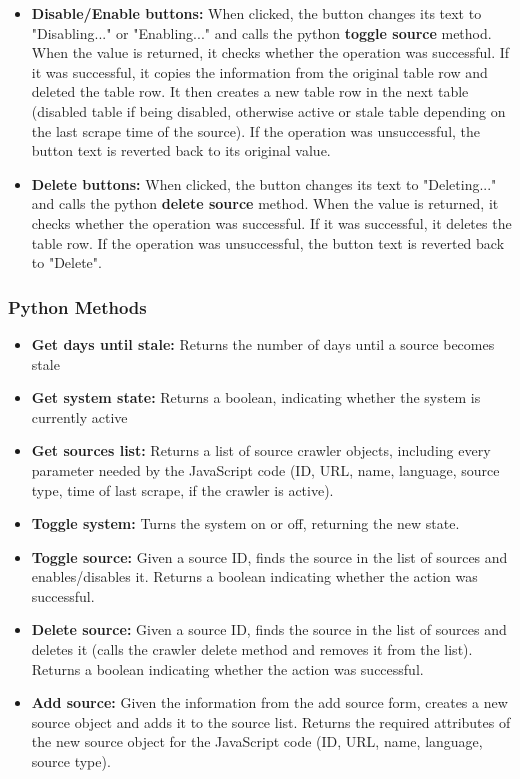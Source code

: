 \documentclass{l4proj}
\begin{document}
\begin{itemize}
    \item \textbf{Disable/Enable buttons: } When clicked, the button changes its text to "Disabling..." or "Enabling..." and calls the python \textbf{toggle source} method. When the value is returned, it checks whether the operation was successful. If it was successful, it copies the information from the original table row and deleted the table row. It then creates a new table row in the next table (disabled table if being disabled, otherwise active or stale table depending on the last scrape time of the source). If the operation was unsuccessful, the button text is reverted back to its original value.
    \item \textbf{Delete buttons: } When clicked, the button changes its text to "Deleting..." and calls the python \textbf{delete source} method. When the value is returned, it checks whether the operation was successful. If it was successful, it deletes the table row. If the operation was unsuccessful, the button text is reverted back to "Delete".
\end{itemize}
\hfill \par
\subsubsection{Python Methods}
\begin{itemize}
    \item \textbf{Get days until stale: } Returns the number of days until a source becomes stale
    \item \textbf{Get system state: } Returns a boolean, indicating whether the system is currently active
    \item \textbf{Get sources list: } Returns a list of source crawler objects, including every parameter needed by the JavaScript code (ID, URL, name, language, source type, time of last scrape, if the crawler is active).
    \item \textbf{Toggle system: } Turns the system on or off, returning the new state.
    \item \textbf{Toggle source: } Given a source ID, finds the source in the list of sources and enables/disables it. Returns a boolean indicating whether the action was successful.
    \item \textbf{Delete source: } Given a source ID, finds the source in the list of sources and deletes it (calls the crawler delete method and removes it from the list). Returns a boolean indicating whether the action was successful.
    \item \textbf{Add source: } Given the information from the add source form, creates a new source object and adds it to the source list. Returns the required attributes of the new source object for the JavaScript code (ID, URL, name, language, source type).
\end{itemize}
\end{document}
